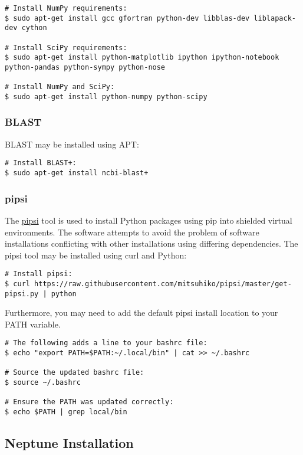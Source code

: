 \documentclass[a4paper,10pt]{article}
\begin{document}
\begin{lstlisting}
# Install NumPy requirements:
$ sudo apt-get install gcc gfortran python-dev libblas-dev liblapack-dev cython

# Install SciPy requirements:
$ sudo apt-get install python-matplotlib ipython ipython-notebook python-pandas python-sympy python-nose

# Install NumPy and SciPy:
$ sudo apt-get install python-numpy python-scipy
\end{lstlisting}

\subsubsection{BLAST}

BLAST may be installed using APT:

\begin{lstlisting}
# Install BLAST+:
$ sudo apt-get install ncbi-blast+
\end{lstlisting}

\subsubsection{pipsi}

The \href{https://github.com/mitsuhiko/pipsi}{pipsi} tool is used to install Python packages using pip into shielded virtual environments. The software attempts to avoid the problem of software installations conflicting with other installations using differing dependencies. The pipsi tool may be installed using curl and Python:

\begin{lstlisting}
# Install pipsi:
$ curl https://raw.githubusercontent.com/mitsuhiko/pipsi/master/get-pipsi.py | python
\end{lstlisting}

Furthermore, you may need to add the default pipsi install location to your PATH variable.

\begin{lstlisting}
# The following adds a line to your bashrc file:
$ echo "export PATH=$PATH:~/.local/bin" | cat >> ~/.bashrc

# Source the updated bashrc file:
$ source ~/.bashrc

# Ensure the PATH was updated correctly:
$ echo $PATH | grep local/bin
\end{lstlisting}

\subsection{Neptune Installation}
\end{document}
